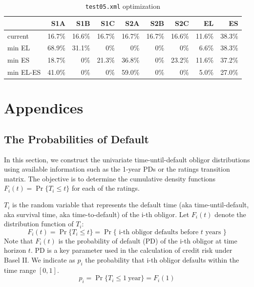 \documentclass[11pt,fleqn]{book} %
\begin{document}
\begin{table}[!hb]
\begin{tabular}{l|rrrrrr|rr}
	          & S1A   & S1B   & S1C   & S2A   & S2B   & S2C   & EL    & ES \\
	\hline
	current   &16.7\% &16.6\% &16.7\% &16.7\% &16.7\% &16.6\% &11.6\% &38.3\% \\
	min EL    &68.9\% &31.1\% &   0\% &   0\% &   0\% &   0\% & 6.6\% &38.3\% \\
	min ES    &18.7\% &   0\% &21.3\% &36.8\% &   0\% &23.2\% &11.6\% &37.2\% \\
	min EL-ES &41.0\% &   0\% &   0\% &59.0\% &   0\% &   0\% & 5.0\% &27.0\% \\
\end{tabular}
	\caption{\texttt{test05.xml} optimization}
	\label{tab:optim1}
\end{table}


\appendix
\chapter{Appendices}

\section{The Probabilities of Default}
\label{ap:pd}

In this section, we construct the univariate time-until-default obligor 
distributions using available information such as the 1-year PDs or the ratings
transition matrix. The objective is to determine the cumulative density 
functions $F_i(t) = \Pr\{T_i \le t\}$ for each of the ratings.

\begin{definition}
	$T_i$ is the random variable that represents the default time 
	(aka time-until-default, aka survival time, aka time-to-default) of the 
	i-th obligor. Let $F_i(t)$ denote the distribution function of $T_i$:
	\begin{displaymath}
		F_i(t) = \Pr\{T_i \le t\} = 
		\Pr\{\text{ i-th obligor defaults before $t$ years }\}
	\end{displaymath}
	Note that $F_i(t)$ is the probability of default (PD) of the i-th obligor
	at time horizon $t$. PD is a key parameter used in the calculation of credit 
	risk under Basel II\@. We indicate as $p_i$ the probability that i-th obligor 
	defaults within the time range $[0,1]$.
	\begin{displaymath}
		p_i = \Pr\{T_i \le 1\ \text{year}\} = F_i(1) 
	\end{displaymath}
\end{definition}
\end{document}
